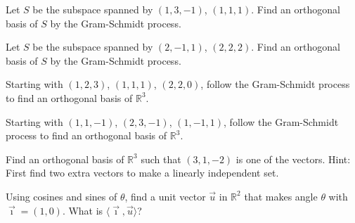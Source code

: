 \documentclass{ximera}
\begin{document}
\begin{exercise}
    Let $S$ be the subspace spanned by $(1,3,-1)$, $(1,1,1)$.  Find an orthogonal basis of $S$ by the Gram-Schmidt process.
\end{exercise}

\begin{exercise}%
    Let $S$ be the subspace spanned by $(2,-1,1)$, $(2,2,2)$.  Find an orthogonal basis of $S$ by the Gram-Schmidt process.
\end{exercise}

\begin{exercise}
    Starting with $(1,2,3)$, $(1,1,1)$, $(2,2,0)$, follow the Gram-Schmidt process to find an orthogonal basis of ${\mathbb{R}}^3$.
\end{exercise}

\begin{exercise}
    Starting with $(1,1,-1)$, $(2,3,-1)$, $(1,-1,1)$, follow the Gram-Schmidt process to find an orthogonal basis of ${\mathbb{R}}^3$.
\end{exercise}

\begin{exercise}
    Find an orthogonal basis of ${\mathbb{R}}^3$ such that $(3,1,-2)$ is one of the vectors.  Hint: First find two extra vectors to make a linearly independent set.
\end{exercise}

\begin{exercise}
    Using cosines and sines of $\theta$, find a unit vector $\vec{u}$ in ${\mathbb{R}}^2$ that makes angle $\theta$ with $\vec{\imath} = (1,0)$.  What is $\langle \vec{\imath} , \vec{u} \rangle$?
\end{exercise}

\end{document}
